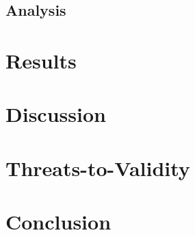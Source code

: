 \documentclass[sigconf,review,anonymous]{acmart}
\begin{document}
\subsection{Analysis}

\section{Results}\label{sec:results}

\section{Discussion}\label{sec:discusssion}
\section{Threats-to-Validity}\label{sec:threats}
\section{Conclusion}\label{sec:conclusion}

\begin{acks}
\end{acks}



\end{document}
